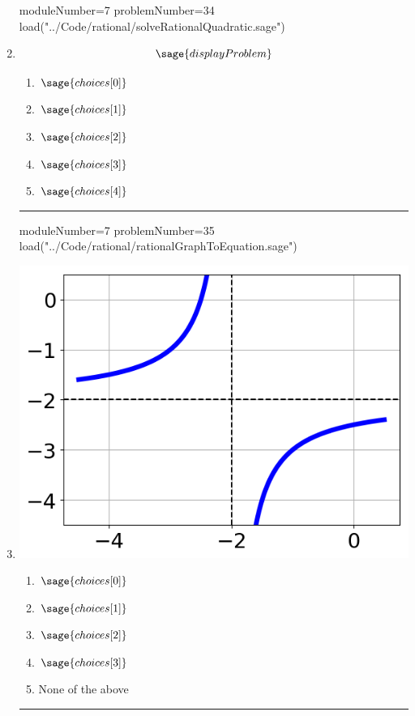 \documentclass[14pt]{article}
\newcommand{\litem}[1]{\item#1\hspace*{-1cm}\rule{\textwidth}{0.4pt}}
\begin{document}
\begin{enumerate}
\begin{sagesilent}
moduleNumber=7
problemNumber=34
load("../Code/rational/solveRationalQuadratic.sage")
\end{sagesilent}

\litem{ 

	\[ \sage{displayProblem} \]

	\begin{enumerate}[label=\Alph*.]
    \item \( \sage{choices[0]} \)
    \item \( \sage{choices[1]} \)
    \item \( \sage{choices[2]} \)
    \item \( \sage{choices[3]} \)
    \item \( \sage{choices[4]} \)
	\end{enumerate}
}

\begin{sagesilent}
moduleNumber=7
problemNumber=35
load("../Code/rational/rationalGraphToEquation.sage")
\end{sagesilent}

\litem{ 

\begin{multicols}{2}
\begin{center}
\includegraphics[width=.3\textwidth]{../Figures/rationalGraphToEquationA.png}
\end{center}

\columnbreak

	\begin{enumerate}[label=\Alph*.]
		\item \( \sage{choices[0]} \)
		\item \( \sage{choices[1]} \)
		\item \( \sage{choices[2]} \)
		\item \( \sage{choices[3]} \)
    \item None of the above
	\end{enumerate}
\end{multicols}
}

\end{enumerate}
\end{document}
